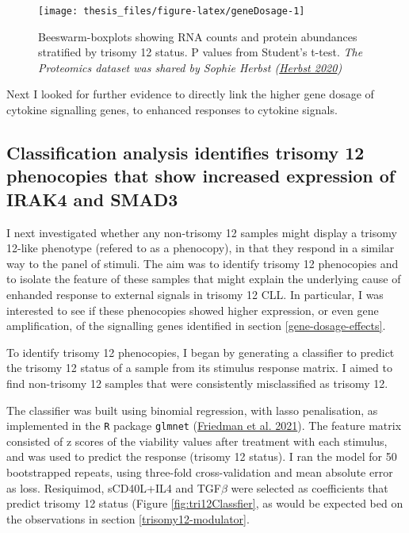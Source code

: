 \documentclass[11pt, a4paper, twosided]{book}
\begin{document}
\begin{figure}

{\centering \texttt{[image: thesis\_files/figure-latex/geneDosage-1]} 

}

\caption{Beeswarm-boxplots showing RNA counts and protein abundances stratified by trisomy 12 status. P values from Student's t-test. \emph{The Proteomics dataset was shared by Sophie Herbst (\protect\hyperlink{ref-HerbstThesis}{Herbst 2020})}}\label{fig:geneDosage}
\end{figure}
Next I looked for further evidence to directly link the higher gene dosage of cytokine signalling genes, to enhanced responses to cytokine signals.

\hypertarget{classification-analysis-identifies-trisomy-12-phenocopies-that-show-increased-expression-of-irak4-and-smad3}{%
\subsection{Classification analysis identifies trisomy 12 phenocopies that show increased expression of IRAK4 and SMAD3}\label{classification-analysis-identifies-trisomy-12-phenocopies-that-show-increased-expression-of-irak4-and-smad3}}

I next investigated whether any non-trisomy 12 samples might display a trisomy 12-like phenotype (refered to as a phenocopy), in that they respond in a similar way to the panel of stimuli. The aim was to identify trisomy 12 phenocopies and to isolate the feature of these samples that might explain the underlying cause of enhanded response to external signals in trisomy 12 CLL. In particular, I was interested to see if these phenocopies showed higher expression, or even gene amplification, of the signalling genes identified in section \ref{gene-dosage-effects}.

To identify trisomy 12 phenocopies, I began by generating a classifier to predict the trisomy 12 status of a sample from its stimulus response matrix. I aimed to find non-trisomy 12 samples that were consistently misclassified as trisomy 12.

The classifier was built using binomial regression, with lasso penalisation, as implemented in the \texttt{R} package \texttt{glmnet} (\protect\hyperlink{ref-R-glmnet}{Friedman et al. 2021}). The feature matrix consisted of z scores of the viability values after treatment with each stimulus, and was used to predict the response (trisomy 12 status). I ran the model for 50 bootstrapped repeats, using three-fold cross-validation and mean absolute error as loss. Resiquimod, sCD40L+IL4 and TGF\(\beta\) were selected as coefficients that predict trisomy 12 status (Figure \ref{fig:tri12Classfier}, as would be expected bed on the observations in section \ref{trisomy12-modulator}.
\end{document}
